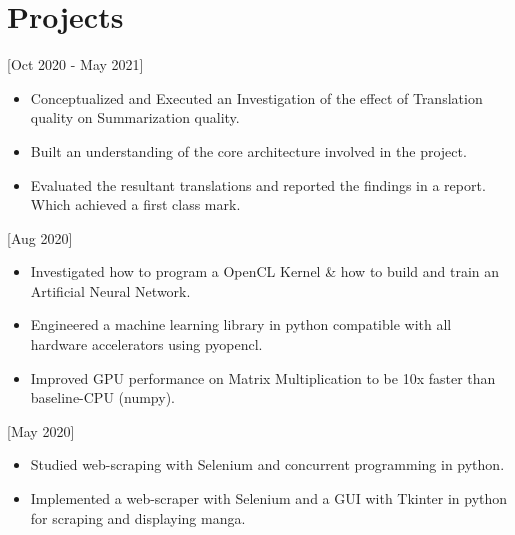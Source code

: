 \documentclass[11pt]{article}
\begin{document}
\section{ Projects}


[Oct 2020 - May 2021]
\begin{itemize}
    \item Conceptualized and Executed an Investigation of the effect of Translation quality on Summarization quality. 
    \item Built an understanding of the core architecture involved in the project.
    \item Evaluated the resultant translations and reported the findings in a report. Which achieved a first class mark.
\end{itemize}

[Aug 2020]
\begin{itemize}
    \item Investigated how to program a OpenCL Kernel \& how to build and train an Artificial Neural Network.
    \item Engineered a machine learning library in python compatible with all hardware accelerators using pyopencl.
    \item Improved GPU performance on Matrix Multiplication to be 10x faster than baseline-CPU (numpy).
    
\end{itemize}

[May 2020]
\begin{itemize}
    \item Studied web-scraping with Selenium and concurrent programming in python. 
    \item Implemented a web-scraper with Selenium and a GUI with Tkinter in python for scraping and displaying manga.
\end{itemize}
\end{document}
